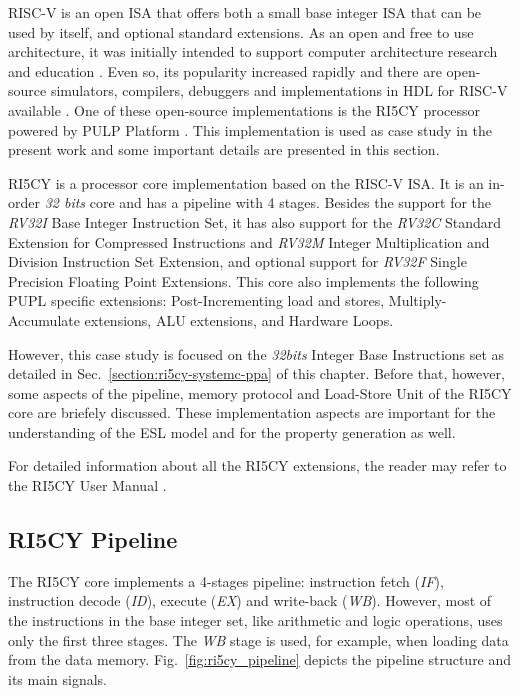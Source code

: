 RISC-V is an open ISA that offers both a small base integer ISA that can be used by itself, and optional standard extensions. As an open and free to use architecture, it was initially intended to support computer architecture research and education \cite{spec-riscv}. Even so, its popularity increased rapidly and there are open-source simulators, compilers, debuggers and implementations in HDL for RISC-V available \cite{book-comp-org}. One of these open-source implementations is the RI5CY processor powered by PULP Platform \cite{pulp}. This implementation is used as case study in the present work and some important details are presented in this section. 

RI5CY is a processor core implementation based on the RISC-V ISA. It is an in-order \textit{32 bits} core and has a pipeline with 4 stages. Besides the support for the \textit{RV32I} Base Integer Instruction Set, it has also support for the \textit{RV32C} Standard Extension for Compressed Instructions and \textit{RV32M} Integer Multiplication and Division Instruction Set Extension, and optional support for \textit{RV32F} Single Precision Floating Point Extensions. This core also implements the following PUPL specific extensions:  Post-Incrementing load and stores, Multiply-Accumulate extensions, ALU extensions, and Hardware Loops.

However, this case study is focused on the \textit{32bits} Integer Base Instructions set  as detailed in Sec.~\ref{section:ri5cy-systemc-ppa} of this chapter. Before that, however, some aspects of the pipeline, memory protocol and Load-Store Unit of the RI5CY core are briefely discussed. These implementation aspects are important for the understanding of the ESL model and for the property generation as well.

For detailed information about all the RI5CY extensions, the reader may refer to the RI5CY User Manual \cite{manual-ri5cy}.

\subsection*{RI5CY Pipeline}

The RI5CY core implements a 4-stages pipeline: instruction fetch (\textit{IF}), instruction decode (\textit{ID}), execute (\textit{EX}) and write-back (\textit{WB}). However, most of the instructions in the base integer set, like arithmetic and logic operations, uses only the first three stages. The \textit{WB} stage is used, for example, when loading data from the data memory. Fig.~\ref{fig:ri5cy_pipeline} depicts the pipeline structure and its main signals.

